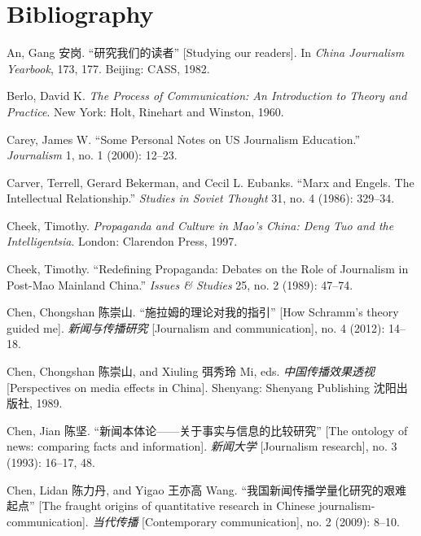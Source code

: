 \documentclass{tufte-handout}
\begin{document}
\begin{CJK*}{UTF8}{gbsn}
\begin{CJK*}{UTF8}{gbsn}
\end{CJK*}





\section{Bibliography}\label{bibliography}

\begin{hangparas}{.25in}{1} 

\begin{CJK*}{UTF8}{gbsn}

An, Gang 安岗. ``研究我们的读者'' {[}Studying our readers{]}. In
\emph{China Journalism Yearbook}, 173, 177. Beijing: CASS, 1982.

Berlo, David K. \emph{The Process of Communication: An Introduction to
Theory and Practice}. New York: Holt, Rinehart and Winston, 1960.

Carey, James W. ``Some Personal Notes on US Journalism Education.''
\emph{Journalism} 1, no. 1 (2000): 12--23.

Carver, Terrell, Gerard Bekerman, and Cecil L. Eubanks. ``Marx and
Engels. The Intellectual Relationship.'' \emph{Studies in Soviet
Thought} 31, no. 4 (1986): 329--34.

Cheek, Timothy. \emph{Propaganda and Culture in Mao's China: Deng Tuo
and the Intelligentsia}. London: Clarendon Press, 1997.

Cheek, Timothy. ``Redefining Propaganda: Debates on the Role of
Journalism in Post-Mao Mainland China.'' \emph{Issues \& Studies} 25,
no. 2 (1989): 47--74.

Chen, Chongshan 陈崇山. ``施拉姆的理论对我的指引'' {[}How Schramm's
theory guided me{]}. \emph{新闻与传播研究} {[}Journalism and
communication{]}, no. 4 (2012): 14--18.

Chen, Chongshan 陈崇山, and Xiuling 弭秀玲 Mi, eds.
\emph{中国传播效果透视} {[}Perspectives on media effects in China{]}.
Shenyang: Shenyang Publishing 沈阳出版社, 1989.

Chen, Jian 陈坚. ``新闻本体论------关于事实与信息的比较研究'' {[}The
ontology of news: comparing facts and information{]}. \emph{新闻大学}
{[}Journalism research{]}, no. 3 (1993): 16--17, 48.

Chen, Lidan 陈力丹, and Yigao 王亦高 Wang.
``我国新闻传播学量化研究的艰难起点'' {[}The fraught origins of
quantitative research in Chinese journalism-communication{]}.
\emph{当代传播} {[}Contemporary communication{]}, no. 2 (2009): 8--10.


\end{CJK*}
\end{hangparas}
\end{CJK*}
\end{document}
